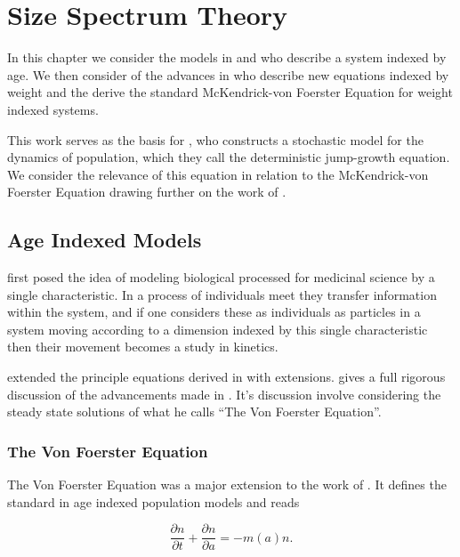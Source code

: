 \documentclass[../main]{subfiles}
\begin{document}
  \chapter{Size Spectrum Theory}\label{chapter:sizetheory}

  In this chapter we consider the models in \cite{mckendrick1926} and \cite{foerster1959} who describe a system indexed by age. We then consider of the advances in \cite{silvert1978} who describe new equations indexed by weight and the derive the standard McKendrick-von Foerster Equation for weight indexed systems.

  This work serves as the basis for \cite{datta2010}, who constructs a stochastic model for the dynamics of population, which they call the deterministic jump-growth equation. We consider the relevance of this equation in relation to the McKendrick-von Foerster Equation drawing further on the work of \cite{datta2010}.

  \section{Age Indexed Models}
  \cite{mckendrick1926} first posed the idea of modeling biological processed for medicinal science by a single characteristic. In a process of individuals meet they transfer information within the system, and if one considers these as individuals as particles in a system moving according to a dimension indexed by this single characteristic then their movement becomes a study in kinetics.

  \cite{foerster1959} extended the principle equations derived in \cite{mckendrick1926} with extensions. \cite{trucco1965} gives a full rigorous discussion of the advancements made in \cite{foerster1959}. It's discussion involve considering the steady state solutions of what he calls ``The Von Foerster Equation''.

  \subsection{The Von Foerster Equation}

  The Von Foerster Equation was a major extension to the work of \cite{mckendrick1926}. It defines the standard in age indexed population models and reads

  \begin{equation}\label{theory:eq:vf}
    \frac{\partial n}{\partial t} + \frac{\partial n}{\partial a} = - m(a)n.
  \end{equation}
\end{document}
